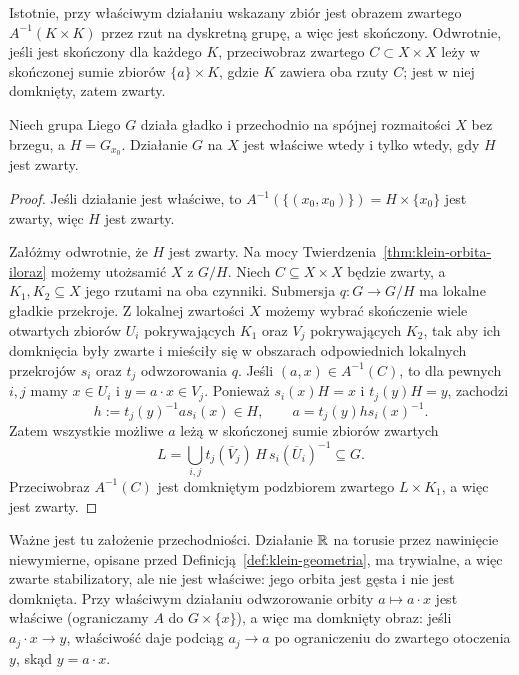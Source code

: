 Istotnie, przy właściwym działaniu wskazany zbiór jest obrazem
zwartego $A^{-1}(K\times K)$ przez rzut na dyskretną grupę,
a więc jest skończony. Odwrotnie, jeśli jest skończony dla
każdego $K$, przeciwobraz zwartego $C\subset X\times X$ leży
w skończonej sumie zbiorów $\{a\}\times K$, gdzie $K$ zawiera
oba rzuty $C$; jest w niej domknięty, zatem zwarty.

\begin{stwierdzenie}
\label{prop:klein-zwarte-h-wlasciwe}
Niech grupa Liego $G$ działa gładko i przechodnio na spójnej
rozmaitości $X$ bez brzegu, a $H=G_{x_0}$.
Działanie $G$ na $X$ jest właściwe wtedy i tylko wtedy,
gdy $H$ jest zwarty.
\end{stwierdzenie}
\begin{proof}
Jeśli działanie jest właściwe, to
$A^{-1}(\{(x_0,x_0)\})=H\times\{x_0\}$ jest zwarty,
więc $H$ jest zwarty.

Załóżmy odwrotnie, że $H$ jest zwarty. Na mocy
Twierdzenia~\ref{thm:klein-orbita-iloraz} możemy utożsamić
$X$ z $G/H$. Niech $C\subseteq X\times X$ będzie zwarty,
a $K_1,K_2\subseteq X$ jego rzutami na oba czynniki.
Submersja $q:G\to G/H$ ma lokalne gładkie przekroje.
Z lokalnej zwartości $X$ możemy wybrać skończenie wiele
otwartych zbiorów $U_i$ pokrywających $K_1$ oraz $V_j$
pokrywających $K_2$, tak aby ich domknięcia były zwarte
i mieściły się w obszarach odpowiednich lokalnych przekrojów
$s_i$ oraz $t_j$ odwzorowania $q$.
Jeśli $(a,x)\in A^{-1}(C)$, to dla pewnych $i,j$ mamy
$x\in U_i$ i $y=a\cdot x\in V_j$. Ponieważ
$s_i(x)H=x$ i $t_j(y)H=y$, zachodzi
\[
 h:=t_j(y)^{-1}a s_i(x)\in H,
 \qquad
 a=t_j(y)h s_i(x)^{-1}.
\]
Zatem wszystkie możliwe $a$ leżą w skończonej sumie
zbiorów zwartych
\[
 L=\bigcup_{i,j}t_j(\overline V_j)\,
 H\,s_i(\overline U_i)^{-1}\subseteq G.
\]
Przeciwobraz $A^{-1}(C)$ jest domkniętym podzbiorem
zwartego $L\times K_1$, a więc jest zwarty.
\end{proof}

Ważne jest tu założenie przechodniości. Działanie $\mathbb{R}$ na
torusie przez nawinięcie niewymierne, opisane przed
Definicją~\ref{def:klein-geometria}, ma trywialne, a więc
zwarte stabilizatory, ale nie jest właściwe: jego orbita jest
gęsta i nie jest domknięta. Przy właściwym działaniu
odwzorowanie orbity $a\mapsto a\cdot x$ jest właściwe
(ograniczamy $A$ do $G\times\{x\}$), a więc ma domknięty obraz:
jeśli $a_j\cdot x\to y$, właściwość daje podciąg $a_j\to a$
po ograniczeniu do zwartego otoczenia $y$, skąd $y=a\cdot x$.

